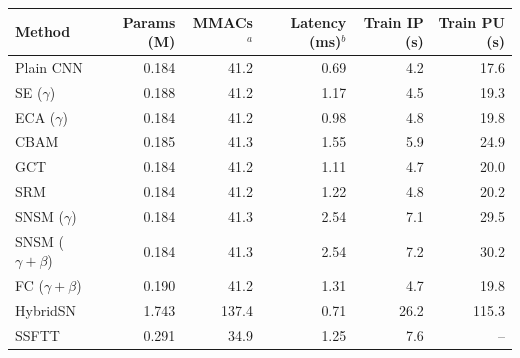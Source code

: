 \begin{tabular}{lrrrrr}
\toprule
Method & Params (M) & MMACs$^{a}$ & Latency (ms)$^{b}$ & Train IP (s) & Train PU (s) \\
\midrule
Plain CNN & 0.184 & 41.2 & 0.69 & 4.2 & 17.6 \\
SE ($\gamma$) & 0.188 & 41.2 & 1.17 & 4.5 & 19.3 \\
ECA ($\gamma$) & 0.184 & 41.2 & 0.98 & 4.8 & 19.8 \\
CBAM & 0.185 & 41.3 & 1.55 & 5.9 & 24.9 \\
GCT & 0.184 & 41.2 & 1.11 & 4.7 & 20.0 \\
SRM & 0.184 & 41.2 & 1.22 & 4.8 & 20.2 \\
SNSM ($\gamma$) & 0.184 & 41.3 & 2.54 & 7.1 & 29.5 \\
SNSM ($\gamma{+}\beta$) & 0.184 & 41.3 & 2.54 & 7.2 & 30.2 \\
FC ($\gamma{+}\beta$) & 0.190 & 41.2 & 1.31 & 4.7 & 19.8 \\
HybridSN & 1.743 & 137.4 & 0.71 & 26.2 & 115.3 \\
SSFTT & 0.291 & 34.9 & 1.25 & 7.6 & -- \\
\bottomrule
\end{tabular}
